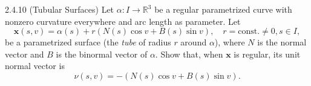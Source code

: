 \documentclass[11pt]{article}
\begin{document}
\begin{problem}{2.4.10 (Tubular Surfaces)}
	Let \(\alpha: I \rightarrow \mathbb{R}^3\) be a regular parametrized curve with nonzero curvature everywhere and arc length as parameter.
	Let
	\begin{equation}
		\label{eq:2}
		\mathbf{x}(s,v) = \alpha(s) + r(N(s)\cos v + B(s)\sin v), \quad r = \text{const.} \neq 0, s \in I,
	\end{equation}
	be a parametrized surface (the \textit{tube} of radius \( r \) around \(\alpha\)), where \( N \) is the normal vector and \( B \) is the binormal vector of \(\alpha\).
	Show that, when \( \mathbf{x} \) is regular, its unit normal vector is
	\begin{equation}
		\label{eq:3}
		\nu(s,v) = -(N(s)\cos v + B(s) \sin v).
	\end{equation}
\end{problem}
\end{document}
